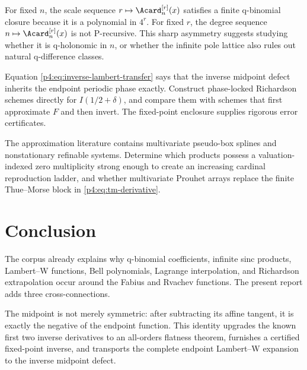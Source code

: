 \documentclass[11pt]{article}
\numberwithin{equation}{section}
\theoremstyle{definition}
\theoremstyle{remark}
\begin{document}
\begin{frontieropenbox}[title=6. q-holonomic versus P-recursive scale sequences]
For fixed $n$, the scale sequence $r\mapsto\Acard_n^{[r]}(x)$ satisfies a finite q-binomial closure because it is a polynomial in $4^r$.  For fixed $r$, the degree sequence $n\mapsto\Acard_n^{[r]}(x)$ is not P-recursive.  This sharp asymmetry suggests studying whether it is q-holonomic in $n$, or whether the infinite pole lattice also rules out natural q-difference classes.
\end{frontieropenbox}

\begin{frontieropenbox}[title=7. Phase-resolved inverse extrapolation]
Equation \eqref{p4:eq:inverse-lambert-transfer} says that the inverse midpoint defect inherits the endpoint periodic phase exactly.  Construct phase-locked Richardson schemes directly for $I(1/2+\delta)$, and compare them with schemes that first approximate $F$ and then invert.  The fixed-point enclosure supplies rigorous error certificates.
\end{frontieropenbox}

\begin{frontieropenbox}[title=8. Multivariate pseudo-box analogues]
The approximation literature contains multivariate pseudo-box splines and nonstationary refinable systems.  Determine which products possess a valuation-indexed zero multiplicity strong enough to create an increasing cardinal reproduction ladder, and whether multivariate Prouhet arrays replace the finite Thue--Morse block in \eqref{p4:eq:tm-derivative}.
\end{frontieropenbox}

\section{Conclusion}
The corpus already explains why q-binomial coefficients, infinite sinc products, Lambert--W functions, Bell polynomials, Lagrange interpolation, and Richardson extrapolation occur around the Fabius and Rvachev functions.  The present report adds three cross-connections.

The midpoint is not merely symmetric: after subtracting its affine tangent, it is exactly the negative of the endpoint function.  This identity upgrades the known first two inverse derivatives to an all-orders flatness theorem, furnishes a certified fixed-point inverse, and transports the complete endpoint Lambert--W expansion to the inverse midpoint defect.
\end{document}
